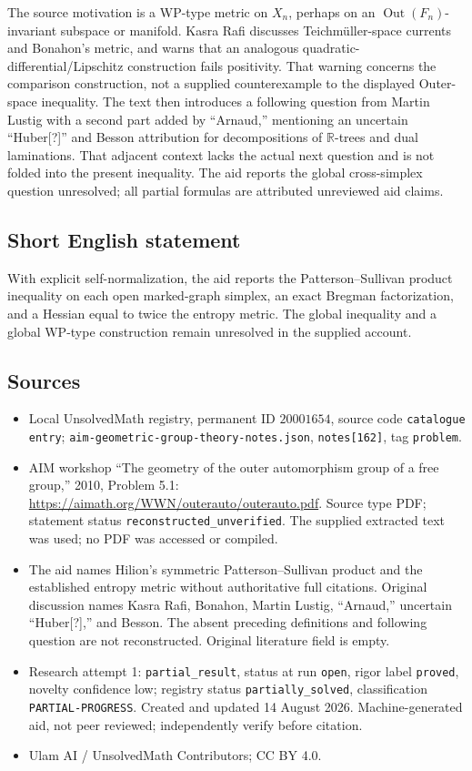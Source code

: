 \documentclass[11pt]{article}
\newcommand{\R}{\mathbb{R}}
\begin{document}
The source motivation is a WP-type metric on \(X_n\), perhaps on an \(\operatorname{Out}(F_n)\)-invariant subspace or manifold. Kasra Rafi discusses Teichm\"uller-space currents and Bonahon's metric, and warns that an analogous quadratic-differential/Lipschitz construction fails positivity. That warning concerns the comparison construction, not a supplied counterexample to the displayed Outer-space inequality. The text then introduces a following question from Martin Lustig with a second part added by ``Arnaud,'' mentioning an uncertain ``Huber[?]'' and Besson attribution for decompositions of \(\R\)-trees and dual laminations. That adjacent context lacks the actual next question and is not folded into the present inequality. The aid reports the global cross-simplex question unresolved; all partial formulas are attributed unreviewed aid claims.
\subsection{Short English statement}
With explicit self-normalization, the aid reports the Patterson--Sullivan product inequality on each open marked-graph simplex, an exact Bregman factorization, and a Hessian equal to twice the entropy metric. The global inequality and a global WP-type construction remain unresolved in the supplied account.
\subsection{Sources}
\begin{itemize}
\item Local UnsolvedMath registry, permanent ID \(20001654\), source code \texttt{catalogue entry}; \texttt{aim-geometric-group-theory-notes.json}, \texttt{notes[162]}, tag \texttt{problem}.
\item AIM workshop ``The geometry of the outer automorphism group of a free group,'' 2010, Problem 5.1: \url{https://aimath.org/WWN/outerauto/outerauto.pdf}. Source type PDF; statement status \texttt{reconstructed\_unverified}. The supplied extracted text was used; no PDF was accessed or compiled.
\item The aid names Hilion's symmetric Patterson--Sullivan product and the established entropy metric without authoritative full citations. Original discussion names Kasra Rafi, Bonahon, Martin Lustig, ``Arnaud,'' uncertain ``Huber[?],'' and Besson. The absent preceding definitions and following question are not reconstructed. Original literature field is empty.
\item Research attempt 1: \texttt{partial\_result}, status at run \texttt{open}, rigor label \texttt{proved}, novelty confidence low; registry status \texttt{partially\_solved}, classification \texttt{PARTIAL-PROGRESS}. Created and updated 14 August 2026. Machine-generated aid, not peer reviewed; independently verify before citation.
\item Ulam AI / UnsolvedMath Contributors; CC BY 4.0.
\end{itemize}
\end{document}

